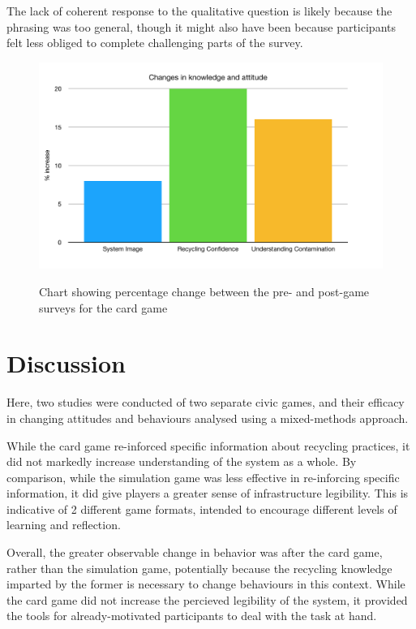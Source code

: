 \documentclass[nofonts,nols,justified,nobib]{tufte-book}
\begin{document}
The lack of coherent response to the qualitative question is likely because the phrasing was too general, though it might also have been because participants felt less obliged to complete challenging parts of the survey. 


\begin{figure}
  \caption{Chart showing percentage change between the pre- and post-game surveys for the card game}
  \includegraphics[width=1\linewidth]{img/4/attitude-changes-llk.png}
  \label{contamination}
\end{figure}

\section*{Discussion}
Here, two studies were conducted of two separate civic games, and their efficacy in changing attitudes and behaviours analysed using a mixed-methods approach.

While the card game re-inforced specific information about recycling practices, it did not markedly increase understanding of the system as a whole. By comparison, while the simulation game was less effective in re-inforcing specific information, it did give players a greater sense of infrastructure legibility. This is indicative of 2 different game formats, intended to encourage different levels of learning and reflection.

Overall, the greater observable change in behavior was after the card game, rather than the simulation game, potentially because the recycling knowledge imparted by the former is necessary to change behaviours in this context. While the card game did not increase the percieved legibility of the system, it provided the tools for already-motivated participants to deal with the task at hand. 
\end{document}
